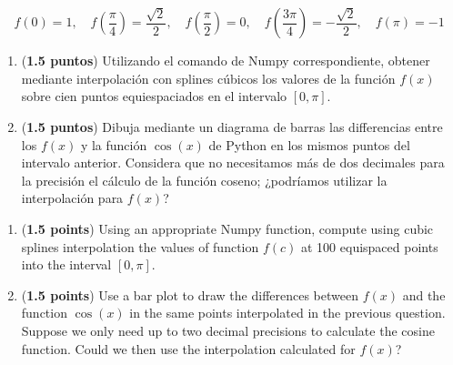 \begin{equation}
	f(0) = 1, \quad f \left(\frac{\pi}{4}\right)= \frac{\sqrt{2}}{2}, \quad f \left(\frac{\pi}{2}\right) = 0, \quad f \left(\frac{3\pi}{4}\right) = -\frac{\sqrt{2}}{2}, \quad f(\pi) = -1 \nonumber
\end{equation}

\begin{paracol}{2}
\begin{enumerate}
	\item (\textbf{1.5 puntos}) Utilizando el comando de Numpy correspondiente, obtener mediante interpolación con splines cúbicos los valores de la función $f(x)$ sobre cien puntos equiespaciados en el intervalo $[0,\pi]$.
	
	\item (\textbf{1.5 puntos}) Dibuja mediante un diagrama de barras las differencias entre los $f(x)$ y la función $\cos(x)$ de Python en los mismos puntos del intervalo anterior. Considera que no necesitamos más de dos decimales para la precisión el cálculo de la función coseno; ¿podríamos utilizar la interpolación para $f(x)$?
\end{enumerate}
\switchcolumn
\begin{enumerate}
	\item (\textbf{1.5 points}) Using an appropriate Numpy function, compute using cubic splines interpolation the values of function $f(c)$ at 100  equispaced points into the interval $[0,\pi]$.
	
	\item (\textbf{1.5 points})  Use a bar plot to draw the differences between $f(x)$ and the function $\cos(x)$ in the same points interpolated in the previous question. Suppose we only need up to two decimal precisions to calculate the cosine function. Could we then use the interpolation calculated for $f(x)$?    
\end{enumerate}
\end{paracol}

